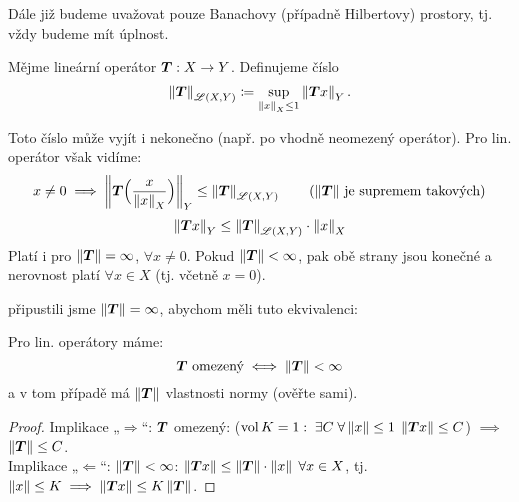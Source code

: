 Dále již budeme uvažovat pouze Banachovy (případně Hilbertovy) prostory, tj. vždy budeme mít úplnost.

\begin{definition}
\label{1.Norma operatoru}
Mějme lineární operátor $\boldsymbol{T}: X \to Y$. Definujeme číslo
$$
  \left\lVert\boldsymbol{T}\right\rVert_{\mathscr{L}(X, Y)} \coloneqq \underset{\left\lVert x\right\rVert_X \leq 1}{\sup} \left\lVert\boldsymbol{T}x\right\rVert_Y.
$$
\end{definition}
Toto číslo může vyjít i nekonečno (např. po vhodně neomezený operátor). Pro lin. operátor však vidíme:
$$
  x \neq 0 \implies
  \left\lVert\boldsymbol{T}\Big(\frac{x}{\left\lVert x\right\rVert_X}\Big)\right\rVert_Y \leq \left\lVert\boldsymbol{T}\right\rVert_{\mathscr{L}(X, Y)}
  \hspace{2em}
  \text{($\left\lVert\boldsymbol{T}\right\rVert$ je supremem takových)}
$$
$$
    \left\lVert\boldsymbol{T}x\right\rVert_Y \leq \left\lVert\boldsymbol{T}\right\rVert_{\mathscr{L}(X, Y)} \cdot \left\lVert x\right\rVert_X
$$
Platí i pro $\left\lVert\boldsymbol{T}\right\rVert = \infty$, $\forall x \neq 0$. Pokud $\left\lVert\boldsymbol{T}\right\rVert < \infty$, pak obě strany jsou konečné a  nerovnost platí $\forall x \in X$ (tj. včetně $x = 0$).
\\
\begin{remark}
připustili jsme $\left\lVert\boldsymbol{T}\right\rVert = \infty$, abychom měli tuto ekvivalenci:
\end{remark}
\begin{lemma}
Pro lin. operátory máme:
$$
    \boldsymbol{T} \text{ omezený}
    \iff
    \left\lVert\boldsymbol{T}\right\rVert < \infty
$$
a v tom případě má $\left\lVert\boldsymbol{T}\right\rVert$ vlastnosti normy (ověřte sami).
\end{lemma}
\begin{proof}
Implikace „$\Rightarrow$“: $\boldsymbol{T}$ omezený: ($\operatorname{vol} K = 1: \; \exists C \; \forall \left\lVert x\right\rVert \leq 1 \; \left\lVert\boldsymbol{T}x\right\rVert \leq C$) $\implies$ $\left\lVert\boldsymbol{T}\right\rVert \leq C$.
\\[5pt]
Implikace „$\Leftarrow$“: $\left\lVert\boldsymbol{T}\right\rVert < \infty$: $\left\lVert\boldsymbol{T}x\right\rVert \leq \left\lVert\boldsymbol{T}\right\rVert \cdot \left\lVert x\right\rVert \; \forall x \in X$, tj. $\left\lVert x\right\rVert \leq K \implies \left\lVert\boldsymbol{T}x\right\rVert \leq K \left\lVert\boldsymbol{T}\right\rVert$.
\end{proof}

